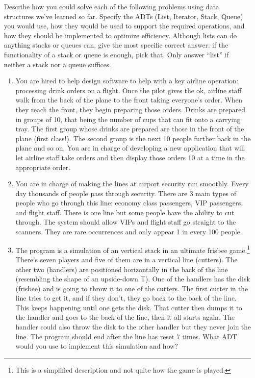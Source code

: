 \documentclass{article}
\begin{document}
Describe how you could solve each of the following problems using data
structures we've learned so far.
Specify the ADTs (List, Iterator, Stack, Queue) you
would use, how they would be used to support the required operations, and
how they should be implemented to optimize efficiency.
Although lists can do anything stacks or queues can, give the most
specific correct answer: if the functionality of a stack or queue is
enough, pick that.
Only answer ``list'' if neither a stack nor a queue suffices.

\begin{enumerate}

\item
You are hired to help design software to help with a key airline
operation: processing drink orders on a flight.
Once the pilot gives the ok, airline staff walk from the back of the plane
to the front taking everyone's order.
When they reach the front, they begin preparing those orders.
Drinks are prepared in groups of 10, that being the number of cups
that can fit onto a carrying tray.
The first group whose drinks are prepared are those in the front of
the plane (first class!).
The second group is the next 10 people further back in the plane and
so on.
You are in charge of developing a new application that will let
airline staff take orders and then display those orders 10 at a time
in the appropriate order.

\item
You are in charge of making the lines at airport security run
smoothly. Every day thousands of people pass through security. There
are 3 main types of people who go through this line: economy class
passengers, VIP passengers, and flight staff. There is one line but
some people have the ability to cut through. The system should allow
VIPs and flight staff go straight to the scanners. They are rare
occurrences and only appear 1 in every 100 people. 

\item
The program is a simulation of an vertical stack in an ultimate
frisbee game.\footnote{This is a simplified description and not quite
  how the game is played.} There's seven players and five of them are
in
a vertical line (cutters).
The other two (handlers) are positioned
horizontally in the back of the line (resembling the shape of an
upside-down T). One of the handlers has the disk (frisbee) and is
going to throw
it to one of the cutters. The first cutter in the line tries to get
it, and if they don't, they go back to the back of the line. This
keeps happening until one gets the disk. That cutter then dumps it to
the handler and goes to the back of the line, then it all starts
again. The handler could also throw the disk to the other handler but
they never join the line. The program should end after the line has
reset 7 times. What ADT would you use to implement this simulation and
how?


\end{enumerate}
\end{document}
